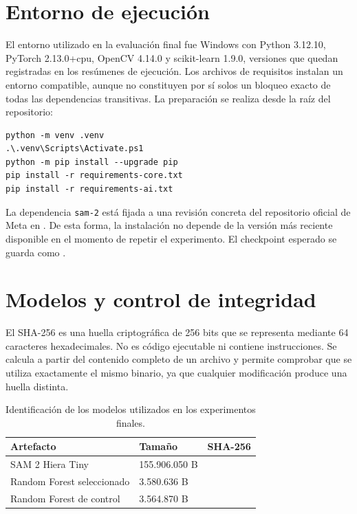 \section{Entorno de ejecución}

El entorno utilizado en la evaluación final fue Windows con Python 3.12.10, PyTorch 2.13.0+cpu, OpenCV 4.14.0 y scikit-learn 1.9.0, versiones que quedan registradas en los resúmenes de ejecución. Los archivos de requisitos instalan un entorno compatible, aunque no constituyen por sí solos un bloqueo exacto de todas las dependencias transitivas. La preparación se realiza desde la raíz del repositorio:

\begin{verbatim}
python -m venv .venv
.\.venv\Scripts\Activate.ps1
python -m pip install --upgrade pip
pip install -r requirements-core.txt
pip install -r requirements-ai.txt
\end{verbatim}

La dependencia \texttt{sam-2} está fijada a una revisión concreta del repositorio oficial de Meta en . De esta forma, la instalación no depende de la versión más reciente disponible en el momento de repetir el experimento. El checkpoint esperado se guarda como .

\section{Modelos y control de integridad}

El SHA-256 es una huella criptográfica de 256 bits que se representa mediante 64 caracteres hexadecimales. No es código ejecutable ni contiene instrucciones. Se calcula a partir del contenido completo de un archivo y permite comprobar que se utiliza exactamente el mismo binario, ya que cualquier modificación produce una huella distinta.

\begin{table}[htbp]
\centering
\footnotesize
\caption{Identificación de los modelos utilizados en los experimentos finales.}
\label{tab:checksums_modelos}
\begin{tabularx}{\textwidth}{p{3.3cm}p{2.2cm}Y}
\toprule
\textbf{Artefacto} & \textbf{Tamaño} & \textbf{SHA-256} \\
\midrule
SAM 2 Hiera Tiny & 155.906.050 B & \ttfamily{} \\
Random Forest seleccionado & 3.580.636 B & \ttfamily{} \\
Random Forest de control & 3.564.870 B & \ttfamily{} \\
\bottomrule
\end{tabularx}
\end{table}

